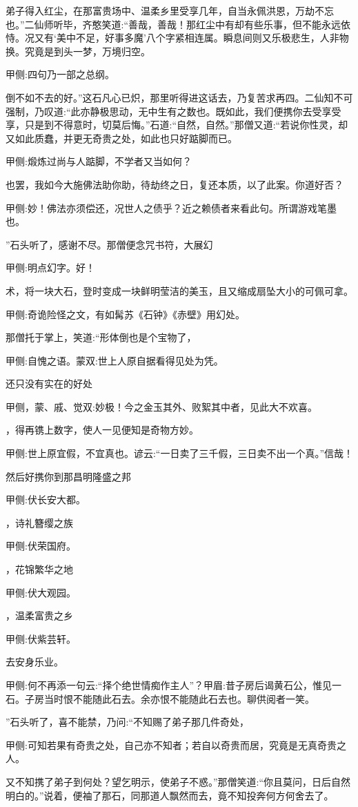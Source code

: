 \begin{parag}
弟子得入红尘，在那富贵场中、温柔乡里受享几年，自当永佩洪恩，万劫不忘也。”二仙师听毕，齐憨笑道:“善哉，善哉！那红尘中有却有些乐事，但不能永远依恃。况又有‘美中不足，好事多魔’八个字紧相连属。瞬息间则又乐极悲生，人非物换。究竟是到头一梦，万境归空。\begin{note}甲侧:四句乃一部之总纲。\end{note}倒不如不去的好。”这石凡心已炽，那里听得进这话去，乃复苦求再四。二仙知不可强制，乃叹道:“此亦静极思动，无中生有之数也。既如此，我们便携你去受享受享，只是到不得意时，切莫后悔。”石道:“自然，自然。”那僧又道:“若说你性灵，却又如此质蠢，并更无奇贵之处，如此也只好踮脚而已。\begin{note}甲侧:煅炼过尚与人踮脚，不学者又当如何？\end{note}也罢，我如今大施佛法助你助，待劫终之日，复还本质，以了此案。你道好否？\begin{note}甲侧:妙！佛法亦须偿还，况世人之债乎？近之赖债者来看此句。所谓游戏笔墨也。\end{note}”石头听了，感谢不尽。那僧便念咒书符，大展幻\begin{note}甲侧:明点幻字。好！\end{note}术，将一块大石，登时变成一块鲜明莹洁的美玉，且又缩成扇坠大小的可佩可拿。\begin{note}甲侧:奇诡险怪之文，有如髯苏《石钟》《赤壁》用幻处。\end{note}那僧托于掌上，笑道:“形体倒也是个宝物了，\begin{note}甲侧:自愧之语。蒙双:世上人原自据看得见处为凭。\end{note}还只没有实在的好处\begin{note}甲侧，蒙、戚、觉双:妙极！今之金玉其外、败絮其中者，见此大不欢喜。\end{note}，得再镌上数字，使人一见便知是奇物方妙。\begin{note}甲侧:世上原宜假，不宜真也。谚云:“一日卖了三千假，三日卖不出一个真。”信哉！\end{note}然后好携你到那昌明隆盛之邦\begin{note}甲侧:伏长安大都。\end{note}，诗礼簪缨之族\begin{note}甲侧:伏荣国府。\end{note}，花锦繁华之地\begin{note}甲侧:伏大观园。\end{note}，温柔富贵之乡\begin{note}甲侧:伏紫芸轩。\end{note}去安身乐业。\begin{note}甲侧:何不再添一句云:“择个绝世情痴作主人”？甲眉:昔子房后谒黄石公，惟见一石。子房当时恨不能随此石去。余亦恨不能随此石去也。聊供阅者一笑。\end{note}”石头听了，喜不能禁，乃问:“不知赐了弟子那几件奇处，\begin{note}甲侧:可知若果有奇贵之处，自己亦不知者；若自以奇贵而居，究竟是无真奇贵之人。\end{note}又不知携了弟子到何处？望乞明示，使弟子不惑。”那僧笑道:“你且莫问，日后自然明白的。”说着，便袖了那石，同那道人飘然而去，竟不知投奔何方何舍去了。

\end{parag}


